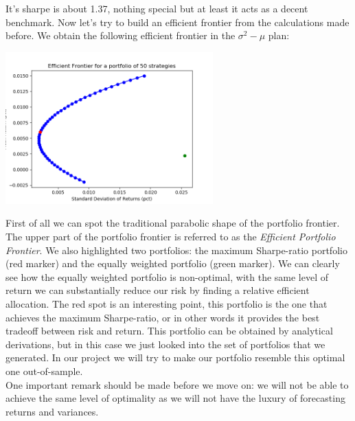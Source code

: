 It's sharpe is about 1.37, nothing special but at least it acts as a decent benchmark. Now let's try to build an efficient frontier from the calculations made before. We obtain the following efficient frontier in the $\sigma^2-\mu$ plan:

\begin{center}
	\centering
	\includegraphics[width=0.6\textwidth]{Portfolio_Theory/Portfolio_Front_Figure_2.png}
	\label{Frontier_frontier}
\end{center}

First of all we can spot the traditional parabolic shape of the portfolio frontier. The upper part of the portfolio frontier is referred to as the \textit{Efficient Portfolio Frontier}. We also highlighted two portfolios: the maximum Sharpe-ratio portfolio (red marker) and the equally weighted portfolio (green marker). We can clearly see how the equally weighted portfolio is non-optimal, with the same level of return we can substantially reduce our risk by finding a relative efficient allocation. The red spot is an interesting point, this portfolio is the one that achieves the maximum Sharpe-ratio, or in other words it provides the best tradeoff between risk and return. This portfolio can be obtained by analytical derivations, but in this case we just looked into the set of portfolios that we generated. In our project we will try to make our portfolio resemble this optimal one out-of-sample.\\
One important remark should be made before we move on: we will not be able to achieve the same level of optimality as we will not have the luxury of forecasting returns and variances.